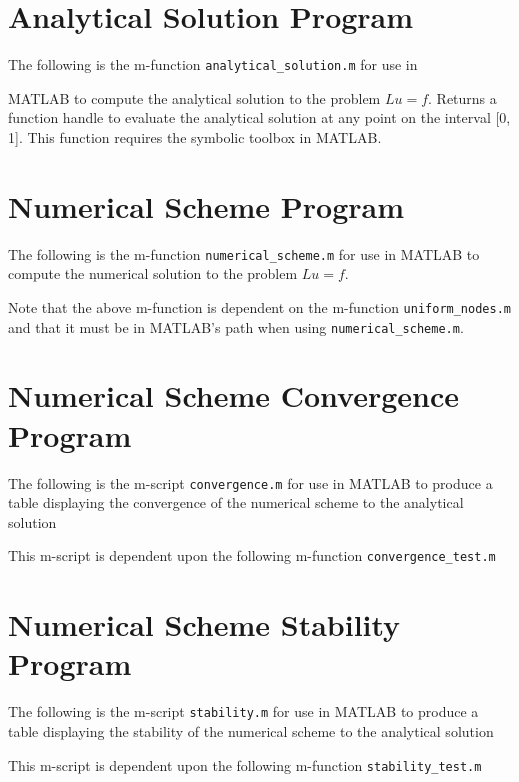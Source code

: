 \documentclass{article}
\begin{document}
\newpage
\begin{appendices}
  \section{Analytical Solution Program}\label{append_analytical}
  The following is the m-function \texttt{analytical\_solution.m} for use in

  MATLAB to compute the analytical solution to the problem $Lu = f$. Returns
  a function handle to evaluate the analytical solution at any point on the
  interval [0, 1]. This function requires the symbolic toolbox in MATLAB.
  

  \newpage
  \section{Numerical Scheme Program}\label{append_numerical}
  The following is the m-function \texttt{numerical\_scheme.m} for use in MATLAB
  to compute the numerical solution to the problem $Lu = f$.
  

  Note that the above m-function is dependent on the m-function
  \texttt{uniform\_nodes.m} and that it must be in MATLAB's path when using
  \texttt{numerical\_scheme.m}.
  

  \newpage
  \section{Numerical Scheme Convergence Program}\label{append_convergence}
  The following is the m-script \texttt{convergence.m} for use in MATLAB to
  produce a table displaying the convergence of the numerical scheme to the analytical
  solution
  

  This m-script is dependent upon the following m-function \texttt{convergence\_test.m}
  

  \newpage
  \section{Numerical Scheme Stability Program}\label{append_stability}
  The following is the m-script \texttt{stability.m} for use in MATLAB to
  produce a table displaying the stability of the numerical scheme to the analytical
  solution
  

  This m-script is dependent upon the following m-function \texttt{stability\_test.m}
  

\end{appendices}
\end{document}
